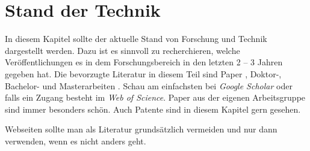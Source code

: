 


\section{Stand der Technik}

In diesem Kapitel sollte der aktuelle Stand von Forschung und Technik dargestellt werden. Dazu ist es sinnvoll zu recherchieren, welche Veröffentlichungen es in dem Forschungsbereich in den letzten 2 -- 3 Jahren gegeben hat. Die bevorzugte Literatur in diesem Teil sind Paper \citep{Peters2017,Peters2018,Bruggeman2013}, Doktor-, Bachelor- und Masterarbeiten \citep{Hirschberg2017,Freier2013}. Schau am einfachsten bei \textit{Google Scholar} oder falls ein Zugang besteht im \textit{Web of Science}. Paper aus der eigenen Arbeitsgruppe sind immer besonders schön. Auch Patente \cite{Liepack2011} sind in diesem Kapitel gern gesehen. 

Webseiten \citep{Northstar2018} sollte man als Literatur grundsätzlich vermeiden und nur dann verwenden, wenn es nicht anders geht.








